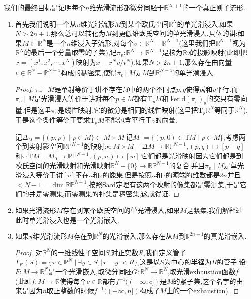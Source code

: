 我们的最终目标是证明每个$n$维光滑流形都微分同胚于$\mathbb{R}^{2n+1}$的一个真正则子流形.
\begin{enumerate}
	\item 首先我们说明一个从$n$维光滑流形$M$到某个欧氏空间$\mathbb{R}^N$的单光滑浸入,如果$N>2n+1$,那么总可以转化为$M$到更低维欧氏空间的单光滑浸入.具体的讲:如果$M\subset\mathbb{R}^N$是一个$n$维浸入子流形,对每个$v\in\mathbb{R}^N-\mathbb{R}^{N-1}$(这里我们把$\mathbb{R}^{N-1}$视为$\mathbb{R}^N$的最后一个分量取零的子集),记$\pi_v:\mathbb{R}^N\to\mathbb{R}^{N-1}$是核为$\mathbb{R}v$的投影映射(此即把$x=(x^1,x^2,\cdots,x^N)$映射为$x-x^Nv/v^N$).如果$N>2n+1$,那么存在由向量$v\in\mathbb{R}^N-\mathbb{R}^{N-1}$构成的稠密集,使得$\pi_v\mid M$是$M$到$\mathbb{R}^{N-1}$的单光滑浸入.
	\begin{proof}
		
		$\pi_v\mid M$是单射等价于讲不存在$M$中的两个不同点$p,q$使得$\vec{pq}$和$v$平行.而$\pi_v\mid M$是光滑浸入等价于讲对每个$p\in M$都有$\mathrm{T}_pM$和$\ker\mathrm{d}(\pi_v)_p$的交只有零向量.但是这里$\pi_v$是线性映射,它的微分是相同的线性映射(这里把$\mathrm{T}_p\mathbb{R}^N$等同于$\mathbb{R}^N$),于是这个条件等价于要求$\mathrm{T}_pM$不能包含平行于$v$的向量.
		
		\qquad
		
		记$\Delta_M=\{(p,p)\mid p\in M\}\subset M\times M$.记$M_0=\{(p,0)\in\mathrm{T}M\mid p\in M\}$,考虑两个到实射影空间$\mathbb{R}\mathbb{P}^{N-1}$的映射:$\kappa:M\times M-\Delta M\to\mathbb{R}\mathbb{P}^{N-1},(p,q)\mapsto[p-q]$和$\tau:\mathrm{T}M-M_0\to\mathbb{R}\mathbb{P}^{N-1},(p,w)\mapsto[w]$.它们都是光滑映射因为它们都是到欧氏空间的光滑映射和光滑映射$\mathbb{R}^N-\{0\}\to\mathbb{R}\mathbb{P}^{N-1}$的复合.并且$\pi_v\mid M$是单光滑浸入等价于讲$[v]$不在$\kappa$和$\tau$的像集.但是按照$\kappa$和$\tau$的源端的维数都是$2n$并且$<N-1=\dim\mathbb{R}\mathbb{P}^{N-1}$,按照Sard定理有这两个映射的像集都是零测集,于是它们的并是零测集,而零测集的补集是稠密集,这就得证.
	\end{proof}
    \item 如果光滑流形$M$存在到某个欧氏空间的单光滑浸入,如果$M$是紧集,我们解释过此时单光滑浸入也是一个光滑嵌入.
    \item 如果$n$维光滑流形$M$存在到$\mathbb{R}^N$的光滑嵌入,那么存在从$M$到$\mathbb{R}^{2n+1}$的真光滑嵌入.
    \begin{proof}
    	
    	对$\mathbb{R}^N$的一维线性子空间$S$,对正实数$R$,我们定义管子$T_R(S)=\{x\in\mathbb{R}^N\mid\exists y\in S, |x-y|<R\}$,这是以$S$为中心的半径为$R$的管子.设$F:M\to\mathbb{R}^N$是一个光滑嵌入,取微分同胚$G:\mathbb{R}^N\to\mathbb{B}^N$,取光滑exhaustion函数$f$(此即$f:M\to\mathbb{R}$使得每个$c\in\mathbb{R}$都有$f^{-1}((-\infty,c])$是$M$的紧子集,这个名字的由来是因为$n$取正整数的时候$f^{-1}((-\infty,n])$构成了$M$上的一个exhaustion).
    	

\end{proof}
\end{enumerate}
